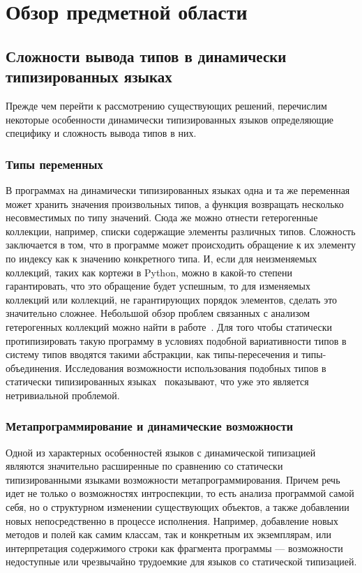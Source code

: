 \chapter{Обзор предметной области}

\section{Сложности вывода типов в динамически типизированных языках}
\label{sec:difficulties}

Прежде чем перейти к рассмотрению существующих решений, перечислим некоторые
особенности динамически типизированных языков определяющие специфику и сложность
вывода типов в них.

\subsection{Типы переменных}

В программах на динамически типизированных языках одна и та же переменная может
хранить значения произвольных типов, а функция возвращать несколько
несовместимых по типу значений. Сюда же можно отнести гетерогенные коллекции,
например, списки содержащие элементы различных типов. Сложность заключается в
том, что в программе может происходить обращение к их элементу по индексу как к
значению конкретного типа. И, если для неизменяемых коллекций, таких как кортежи
в Python, можно в какой-то степени гарантировать, что это обращение будет
успешным, то для изменяемых коллекций или коллекций, не гарантирующих порядок
элементов, сделать это значительно сложнее. Небольшой обзор проблем связанных с
анализом гетерогенных коллекций можно найти в работе~\cite[]{Salib2004}. 
Для того чтобы статически протипизировать такую программу в условиях подобной
вариативности типов в систему типов вводятся такими абстракции, как
типы-пересечения и типы-объединения. Исследования возможности использования
подобных типов в статически типизированных
языках~\cite[]{Igarashi2006,Ortin2011:union}  показывают, что уже это является
нетривиальной проблемой.

\subsection{Метапрограммирование и динамические возможности}

Одной из характерных особенностей языков с динамической типизацией являются
значительно расширенные по сравнению со статически типизированными языками
возможности метапрограммирования. Причем речь идет не только о возможностях
интроспекции, то есть анализа программой самой себя, но о структурном изменении
существующих объектов, а также добавлении новых непосредственно в процессе
исполнения. Например, добавление новых методов и полей как самим классам, так и
конкретным их экземплярам, или интерпретация содержимого строки как фрагмента
программы --- возможности недоступные или чрезвычайно трудоемкие для языков со
статической типизацией.

